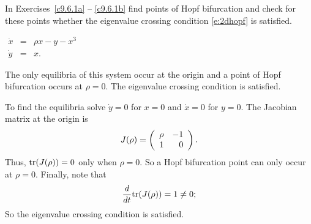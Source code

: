 \documentclass{ximera}
\begin{document}
\noindent In Exercises~\ref{c9.6.1a} -- \ref{c9.6.1b} find points of Hopf
bifurcation and check for these points whether the eigenvalue crossing
condition \eqref{e:2dhopf} is satisfied.
\begin{exercise} \label{c9.6.1a}
$\begin{array}{rcl}
\dot{x} & = & \rho x - y -x^3 \\
\dot{y} & = & x.
\end{array}$

\begin{solution}

\ans The only equilibria of this system occur at the origin and a point of
Hopf bifurcation occurs at $\rho=0$.  The eigenvalue crossing condition is
satisfied.

\soln  To find the equilibria solve $\dot{y}=0$ for $x=0$ and $\dot{x}=0$ for
$y=0$.  The Jacobian matrix at the origin is 
\[
J(\rho) = \left(\begin{array}{rr} \rho & -1\\ 1 &0\end{array}\right).
\]
Thus, ${\rm tr}(J(\rho))=0$ only when $\rho=0$.  So a Hopf bifurcation point
can only occur at $\rho=0$.  Finally, note that 
\[
\frac{d}{dt}{\rm tr}(J(\rho)) = 1 \neq 0;
\]
So the eigenvalue crossing condition is satisfied.


\end{solution}
\end{exercise}
\end{document}
